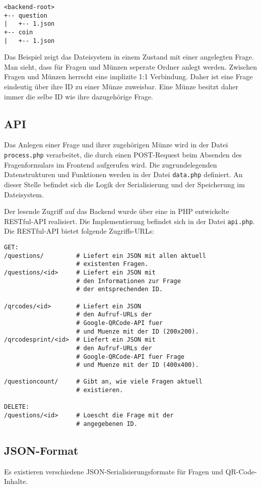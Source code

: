 \begin{verbatim}
<backend-root>
+-- question
|   +-- 1.json
+-- coin
|   +-- 1.json
\end{verbatim}

Das Beispiel zeigt das Dateisystem in einem Zustand mit einer angelegten Frage. Man sieht, dass für Fragen und Münzen seperate Ordner anlegt werden. Zwischen Fragen und Münzen herrscht eine implizite 1:1 Verbindung. Daher ist eine Frage eindeutig über ihre ID zu einer Münze zuweisbar. Eine Münze besitzt daher immer die selbe ID wie ihre dazugehörige Frage.

\subsection{API}
\label{subs:API}
Das Anlegen einer Frage und ihrer zugehörigen Münze wird in der Datei \texttt{process.php} verarbeitet, die durch einen POST-Request beim Absenden des Fragenformulars im Frontend aufgerufen wird. Die zugrundelegenden Datenstrukturen und Funktionen werden in der Datei \texttt{data.php} definiert. An dieser Stelle befindet sich die Logik der Serialisierung und der Speicherung im Dateisystem.

Der lesende Zugriff auf das Backend wurde über eine in PHP entwickelte RESTful-API realisiert. Die Implementierung befindet sich in der Datei \texttt{api.php}.
Die RESTful-API bietet folgende Zugriffs-URLs:

 \begin{lstlisting}
GET:
/questions/         # Liefert ein JSON mit allen aktuell
                    # existenten Fragen.
/questions/<id>     # Liefert ein JSON mit
                    # den Informationen zur Frage
                    # der entsprechenden ID.

/qrcodes/<id>       # Liefert ein JSON
                    # den Aufruf-URLs der
                    # Google-QRCode-API fuer
                    # und Muenze mit der ID (200x200).
/qrcodesprint/<id>  # Liefert ein JSON mit
                    # den Aufruf-URLs der
                    # Google-QRCode-API fuer Frage
                    # und Muenze mit der ID (400x400).

/questioncount/     # Gibt an, wie viele Fragen aktuell
                    # existieren.

DELETE:
/questions/<id>     # Loescht die Frage mit der
                    # angegebenen ID.
\end{lstlisting}

\subsection{JSON-Format}
\label{sub:JSON-Format}
Es existieren verschiedene JSON-Serialisierungsformate für Fragen und QR-Code-Inhalte.

